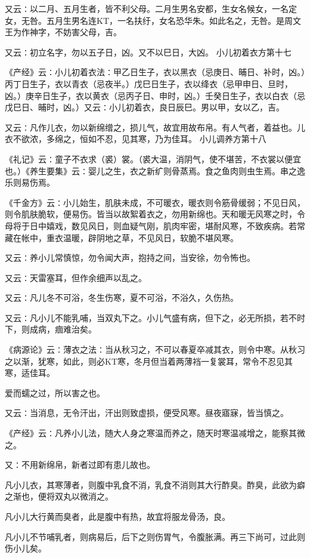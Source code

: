 \documentclass[a4paper,12pt,UTF8,twoside]{ctexbook}
\begin{document}
又云∶以二月、五月生者，皆不利父母。二月生男名安都，生女名候女，一名定女，无咎。五月生男名连KT，一名扶纡，女名恐华朱。如此名之，无咎。是周文王为作神字，不妨害父母，吉。

又云∶初立名字，勿以五子日，凶。又不以巳日，大凶。
小儿初着衣方第十七

《产经》云∶小儿初着衣法∶甲乙日生子，衣以黑衣（忌庚日、晡日、补时，凶。）丙丁日生子，衣以青衣（忌夜半。）戊巳日生子，衣以绛衣（忌甲申日、旦时，凶。）庚辛日生子，衣以黄衣（忌丙子日、申时，凶。）壬癸日生子，衣以白衣（忌戊巳日、晡时，凶。）又云∶小儿初着衣，良日辰巳。男以甲，女以乙，吉。

又云∶凡作儿衣，勿以新绵缯之，损儿气，故宜用故布帛。有人气者，着益也。儿衣不欲浓，多绵之，恒如不忍，见其寒，乃为佳耳。
小儿调养方第十八

《礼记》云∶童子不衣求（裘）裳。（裘大温，消阴气，使不堪苦，不衣裳以便宜也。）《养生要集》云∶婴儿之生，衣之新纩则骨蒸焉。食之鱼肉则虫生焉。串之逸乐则易伤焉。

《千金方》云∶小儿始生，肌肤未成，不可暖衣，暖衣则令筋骨缓弱；不见日风，则令肌肤脆软，便易伤。皆当以故絮着衣之，勿用新绵也。天和暖无风寒之时，令母将于日中嬉戏，数见风日，则血疑气刚，肌肉牢密，堪耐风寒，不致疾病。若常藏在帐中，重衣温暖，辟阴地之草，不见风日，软脆不堪风寒。

又云∶养小儿常慎惊，勿令闻大声，抱持之间，当安徐，勿令怖也。

又云∶天雷塞耳，但作余细声以乱之。

又云∶凡儿冬不可浴，冬生伤寒，夏不可浴，不浴久，久伤热。

又云∶凡小儿不能乳哺，当双丸下之。小儿气盛有病，但下之，必无所损，若不时下，则成病，痼难治矣。

《病源论》云∶薄衣之法∶当从秋习之，不可以春夏卒减其衣，则令中寒。从秋习之以渐，犹寒，如此，则必KT寒，冬月但当着两薄裆一复裳耳，常令不忍见其寒，适佳耳。

爱而蠕之过，所以害之也。

又云∶当消息，无令汗出，汗出则致虚损，便受风寒。昼夜寤寐，皆当慎之。

《产经》云∶凡养小儿法，随大人身之寒温而养之，随天时寒温减增之，能察其微之。

又∶不用新绵帛，新者过即有患儿故也。

凡小儿衣，其寒薄者，则腹中乳食不消，乳食不消则其大行酢臭。酢臭，此欲为癖之渐也，便将双丸以微消之。

凡小儿大行黄而臭者，此是腹中有热，故宜将服龙骨汤，良。

凡小儿不节哺乳者，则病易后，后下之则伤胃气，令腹胀满。再三下尚可，过此则伤小儿矣。
\end{document}
